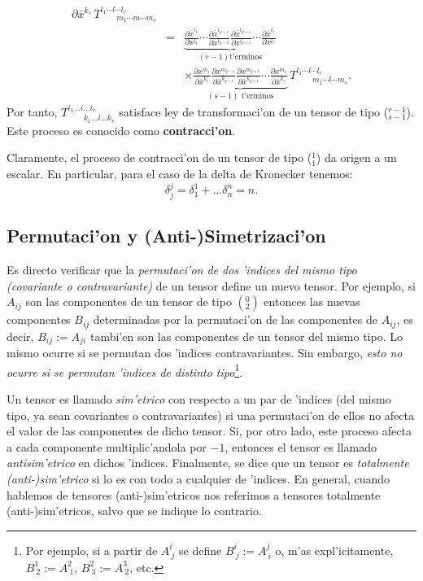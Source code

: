 \begin{eqnarray}
{\partial\bar{x}^{k_{s}}}\,T_{\ \ \ \ \ \ \ \ \ m_1\cdots m\cdots
m_{s}}^{l_1\cdots l\cdots l_{r}}\\
&=&\underbrace{\frac{\partial\bar{x}^{i_1}}{\partial x^{l_1}}\cdots
\frac{\partial\bar{x}^{i_{p-1}}}{\partial x^{l_{p-1}}} \frac{\partial\bar{x}^{i_{p+1}}}{\partial x^{l_{p+1}}} \cdots\frac{\partial\bar{x}^{i_{r}}}{\partial x^{l_{r}}}}_{(r-1) \text{
t'erminos}}\nonumber \\
&& \times \underbrace{\frac{\partial
x^{m_1}}{\partial\bar{x}^{k_1}}\frac{\partial
x^{m_{q-1}}}{\partial\bar{x}^{k_{q-1}}} \frac{\partial
x^{m_{q+1}}}{\partial\bar{x}^{k_{q+1}}}\cdots \frac{\partial x^{m_{s}}}
{\partial\bar{x}^{k_{s}}}}_{(s-1) \text{ t'erminos}}\,T_{\ \ \ \ \ \ \ \ \
m_1\cdots l\cdots m_{s}}^{l_1\cdots l\cdots l_{r}}.
\end{eqnarray}
Por tanto, $T_{\ \ \ \ \ \ \ \ \ k_1\dots i\dots k_{s}}^{i_1\dots i\dots
i_{r}} $ satisface ley de transformaci'on de un tensor de tipo ($_{s-1}^{r-1}$).
Este proceso es conocido como \textbf{contracci'on}.

Claramente, el proceso de contracci'on de un tensor de tipo ($_1^1$) da
origen a un escalar. En particular, para el caso de la delta de Kronecker
tenemos:
\begin{equation}
\delta_j^j =\delta_1^1+\dots \delta_n^n=n. \label{con2}
\end{equation}


\subsection{Permutaci'on y (Anti-)Simetrizaci'on}

Es directo verificar que la \textit{permutaci'on de dos 'indices del mismo tipo (covariante o contravariante)} de un tensor define un nuevo tensor. Por ejemplo, si $A_{ij}$ son las componentes de un tensor de tipo $(^0_2)$ entonces las nuevas componentes $B_{ij}$ determinadas por la permutaci'on de las componentes de $A_{ij}$, es decir, $B_{ij}:=A_{ji}$ tambi'en son las componentes de un tensor del mismo tipo. Lo mismo ocurre si se permutan dos 'indices contravariantes. Sin embargo, \textit{esto no ocurre si se permutan 'indices de distinto tipo}\footnote{Por ejemplo, si a partir de $A^i_{\ j}$ se define $B^i_{\ j}:=A^j_{\ i}$ o, m'as expl'icitamente, $B^1_{\ 2}:=A^2_{\ 1}$, $B^2_{\ 3}:=A^3_{\ 2}$, etc.}.

 Un tensor es llamado \textit{sim'etrico} con respecto a un par de 'indices (del mismo tipo, ya sean covariantes o contravariantes) si una permutaci'on de ellos no afecta el valor de las componentes de dicho tensor. Si, por otro lado, este proceso afecta a cada
componente multiplic'andola por $-1$, entonces el tensor es llamado
\textit{antisim'etrico} en dichos 'indices. Finalmente, se dice que un tensor es
\textit{totalmente (anti-)sim'etrico} si lo es con todo a cualquier de 'indices. En general, cuando hablemos de tensores (anti-)sim'etricos nos referimos a tensores totalmente (anti-)sim'etricos, salvo que se indique lo contrario.

